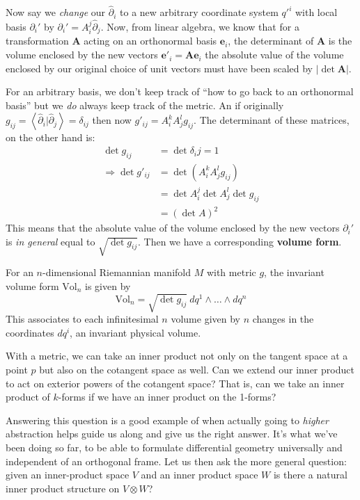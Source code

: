 	Now say we \emph{change} our $\hat \partial_i$ to a new arbitrary coordinate system $q'^i$ with local basis $\partial_i'$ by $\partial_i'=A^j_i \hat \partial_j$. Now, from linear algebra, we know that for a transformation $\mathbf A$ acting on an orthonormal basis $\mathbf e_i$, the determinant of $\mathbf A$ is the volume enclosed by the new vectors $\mathbf e'_i = \mathbf A \mathbf e_i$ the absolute value of the volume enclosed by our original choice of unit vectors must have been scaled by $|\det \mathbf A|$.
	
	For an arbitrary basis, we don't keep track of ``how to go back to an orthonormal basis'' but we \emph{do} always keep track of the metric. An if originally $g_{ij} = \left< \hat \partial_i| \hat \partial_j \right> = \delta_{ij}$ then now $g'_{ij} = A^{k}_i A^{l}_j g_{ij}$. The determinant of these matrices, on the other hand is:
	\begin{align*}
		\det g_{ij} &= \det \delta_ij =1\\
		 \Rightarrow \det g'_{ij} &= \det(A^{k}_i A^{l}_j g_{ij})\\
		 & = \det A^j_i \det A^l_j \det g_{ij} \\
		 & = (\det A)^2
	\end{align*}
	This means that the absolute value of the volume enclosed by the new vectors $\partial_i'$ is \emph{in general} equal to $\sqrt{\det g_{ij}}$. Then we have a corresponding \textbf{volume form}.
	\begin{defn}
		For an $n$-dimensional Riemannian manifold $M$ with metric $g$, the invariant volume form $\mathrm{Vol}_n$ is given by
		\begin{equation}
			\mathrm{Vol}_n = \sqrt{\det g_{ij}} ~ dq^1 \wedge \dots \wedge dq^n
		\end{equation}
		This associates to each infinitesimal $n$ volume given by $n$ changes in the coordinates $dq^i$, an invariant physical volume.
	\end{defn}
	
	With a metric, we can take an inner product not only on the tangent space at a point $p$ but also on the cotangent space as well. Can we extend our inner product to act on exterior powers of the cotangent space? That is, can we take an inner product of $k$-forms if we have an inner product on the 1-forms?
	
	Answering this question is a good example of when actually going to \emph{higher} abstraction helps guide us along and give us the right answer. It's what we've been doing so far, to be able to formulate differential geometry universally and independent of an orthogonal frame. Let us then ask the more general question: given an inner-product space $V$ and an inner product space $W$ is there a natural inner product structure on $V \otimes W$?
	
